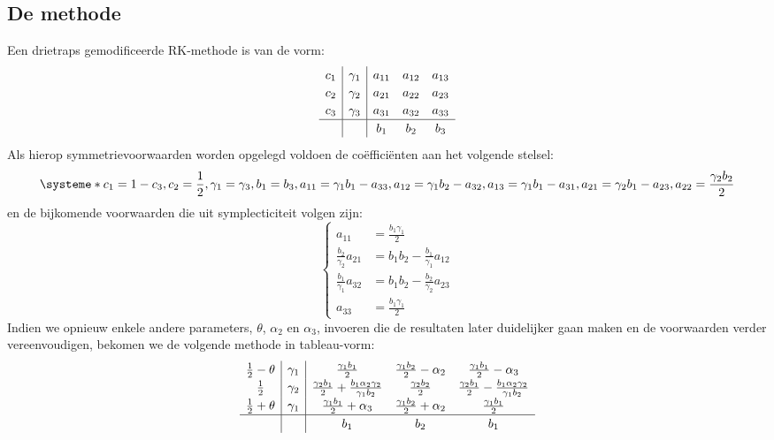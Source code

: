 \documentclass[12pt]{article}
\begin{document}
\subsection{De methode}
Een drietraps gemodificeerde RK-methode is van de vorm:
\[
\renewcommand\arraystretch{1.2}
\begin{array}
{c|c|ccc}
c_1 & \gamma_1 & a_{11} & a_{12} & a_{13} \\
c_2 & \gamma_2 & a_{21} & a_{22} & a_{23} \\
c_3 & \gamma_3 & a_{31} & a_{32} & a_{33} \\
\hline
&& b_1 & b_2 & b_3
\end{array}
\]
Als hierop symmetrievoorwaarden worden opgelegd voldoen de coëfficiënten aan het volgende stelsel:
\[\systeme*{c_1=1-c_3,c_2=\frac{1}{2},\gamma_1=\gamma_3,b_1=b_3,a_{11}=\gamma_1 b_1-a_{33},a_{12}=\gamma_1 b_2-a_{32},a_{13}=\gamma_1 b_1-a_{31},a_{21}=\gamma_2 b_1-a_{23},a_{22}=\frac{\gamma_2 b_2}{2}}\]
en de bijkomende voorwaarden die uit symplecticiteit volgen zijn:
\begin{equation*}
    \begin{cases}
        a_{11}&=\frac{b_1\gamma_1}{2} \\
        \frac{b_2}{\gamma_2}a_{21}&=b_1b_2-\frac{b_1}{\gamma_1}a_{12} \\
        \frac{b_1}{\gamma_1}a_{32}&=b_1b_2-\frac{b_2}{\gamma_2}a_{23} \\
        a_{33}&=\frac{b_1\gamma_1}{2}
    \end{cases}
\end{equation*}
Indien we opnieuw enkele andere parameters, \(\theta\), \(\alpha_2\) en \(\alpha_3\), invoeren die de resultaten later duidelijker gaan maken en de voorwaarden verder vereenvoudigen, bekomen we de volgende methode in tableau-vorm:
\begin{equation} \label{eq:rks3}
\renewcommand\arraystretch{1.2}
\begin{array}
{c|c|ccc}
\frac{1}{2}-\theta & \gamma_1 & \frac{\gamma_1 b_1}{2} & \frac{\gamma_1 b_2}{2}-\alpha_2 & \frac{\gamma_1 b_1}{2}-\alpha_3 \\
\frac{1}{2} & \gamma_2 & \frac{\gamma_2 b_1}{2}+\frac{b_1\alpha_2\gamma_2}{\gamma_1b_2} & \frac{\gamma_2 b_2}{2} &  \frac{\gamma_2 b_1}{2}-\frac{b_1\alpha_2\gamma_2}{\gamma_1b_2} \\
\frac{1}{2}+\theta & \gamma_1 & \frac{\gamma_1 b_1}{2}+\alpha_3 & \frac{\gamma_1 b_2}{2}+\alpha_2 & \frac{\gamma_1 b_1}{2} \\
\hline
&& b_1 & b_2 & b_1 
\end{array}
\end{equation}
\end{document}
